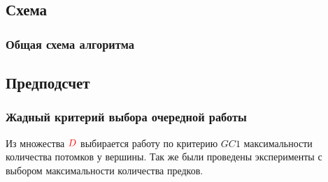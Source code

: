 
\subsection{Схема}
\begin{frame}
    \frametitle{Общая схема алгоритма}
    {\tiny
    }
\end{frame}

\subsection{Предподсчет}

\begin{frame}
    \frametitle{Жадный критерий выбора очередной работы}
    Из множества $\color{red}D$ выбирается работу по критерию $GC1$ максимальности количества потомков у вершины.
    Так же были проведены эксперименты с выбором максимальности количества предков.
    \vspace{1.3cm}
\end{frame}

